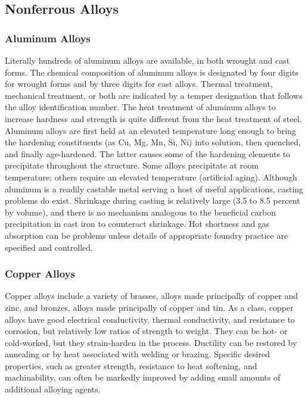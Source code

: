 \documentclass[a4paper,openany,nobib]{tufte-book}
\begin{document}
\subsection{Nonferrous Alloys}
\label{nonferrous-alloys}
\subsubsection{Aluminum Alloys}
\label{aluminum-alloys}
Literally hundreds of aluminum alloys are available, in both wrought and
cast forms. The chemical composition of aluminum alloys is designated by
four digits for wrought forms and by three digits for cast alloys.
Thermal treatment, mechanical treatment, or both are indicated by a
temper designation that follows the alloy identification number. The
heat treatment of aluminum alloys to increase hardness and strength is
quite different from the heat treatment of steel. Aluminum alloys are
first held at an elevated temperature long enough to bring the hardening
constituents (as Cu, Mg, Mn, Si, Ni) into solution, then quenched, and
finally age-hardened. The latter causes some of the hardening elements
to precipitate throughout the structure. Some alloys precipitate at room
temperature; others require an elevated temperature (artificial aging).
Although aluminum is a readily castable metal serving a host of useful
applications, casting problems do exist. Shrinkage during casting is
relatively large (3.5 to 8.5 percent by volume), and there is no
mechanism analogous to the beneficial carbon precipitation in cast iron
to counteract shrinkage. Hot shortness and gas absorption can be
problems unless details of appropriate foundry practice are specified
and controlled.

\subsubsection{Copper Alloys}
\label{copper-alloys}
Copper alloys include a variety of brasses, alloys made principally of
copper and zinc, and bronzes, alloys made principally of copper and tin.
As a class, copper alloys have good electrical conductivity, thermal
conductivity, and resistance to corrosion, but relatively low ratios of
strength to weight. They can be hot- or cold-worked, but they
strain-harden in the process. Ductility can be restored by annealing or
by heat associated with welding or brazing. Specific desired properties,
such as greater strength, resistance to heat softening, and
machinability, can often be markedly improved by adding small amounts of
additional alloying agents.
\end{document}
